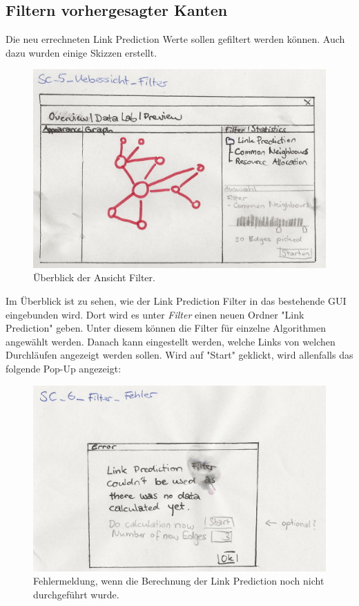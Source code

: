 \subsection{Filtern vorhergesagter Kanten}

Die neu errechneten Link Prediction Werte sollen gefiltert werden können. Auch dazu wurden einige Skizzen erstellt.

\begin{figure}[htbp]
    \includegraphics[width=\linewidth]{resources/SC-5.png}
    \caption{Überblick der Ansicht Filter.}
    \label{fig:screen5}
\end{figure}

Im Überblick ist zu sehen, wie der Link Prediction Filter in das bestehende GUI eingebunden wird. Dort wird es unter
\textit{Filter} einen neuen Ordner "Link Prediction" geben. Unter diesem können die Filter für einzelne Algorithmen
angewählt werden. Danach kann eingestellt werden, welche Links von welchen Durchläufen angezeigt werden sollen. Wird auf
"Start" geklickt, wird allenfalls das folgende Pop-Up angezeigt:

\begin{figure}[htbp]
    \includegraphics[width=\linewidth]{resources/SC-6.png}
    \caption{Fehlermeldung, wenn die Berechnung der Link Prediction noch nicht durchgeführt wurde.}
    \label{fig:screen6}
\end{figure}

